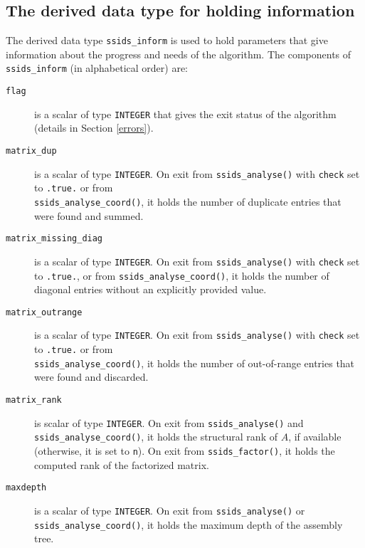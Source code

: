 
\subsection{The derived data type for holding information}
\label{typeinform}
The derived data type {\tt ssids\_inform}
is used to hold parameters that give information about the progress and needs
of the algorithm. The components of {\tt ssids\_inform}
(in alphabetical order) are:

\begin{description}

\item[\texttt{flag}] is a scalar of type  {\tt INTEGER}
that gives the exit status of the algorithm (details in Section \ref{errors}).

\item[\texttt{matrix\_dup}] is a scalar  of type  {\tt INTEGER}.
On exit from {\tt ssids\_analyse()}
with {\tt check} set to {\tt .true.} or from \\
{\tt ssids\_analyse\_coord()}, it holds the
number of duplicate entries that were found and summed.

\item[\texttt{matrix\_missing\_diag}] is a scalar of type {\tt INTEGER}.
On exit from {\tt ssids\_analyse()} with {\tt check} set to {\tt .true.},
or from {\tt ssids\_analyse\_coord()}, it holds the number of diagonal
entries without an explicitly provided value.

\item[\texttt{matrix\_outrange}] is a scalar  of type  {\tt INTEGER}.
On exit from {\tt ssids\_analyse()}
with {\tt check} set to {\tt .true.} or from \\
{\tt ssids\_analyse\_coord()}, it holds the
number of out-of-range entries that were   found and discarded.

\item[\texttt{matrix\_rank}] is scalar of type  {\tt INTEGER}. On exit from
{\tt ssids\_analyse()} and {\tt ssids\_analyse\_coord()}, it holds
the structural rank of $A$, if available (otherwise, it is set to {\tt n}).
On exit from
{\tt ssids\_factor()}, it holds the computed rank of
the factorized matrix.

\item[\texttt{maxdepth}] is a scalar of type  {\tt INTEGER}. On exit from
{\tt ssids\_analyse()} or {\tt ssids\_analyse\_coord()}, it holds the maximum depth of the assembly tree.


\end{description}

